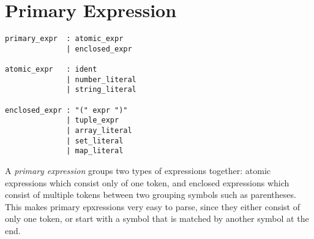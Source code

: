 \section{Primary Expression}

\begin{verbatim}
primary_expr  : atomic_expr
              | enclosed_expr

atomic_expr   : ident
              | number_literal
              | string_literal

enclosed_expr : "(" expr ")"
              | tuple_expr
              | array_literal
              | set_literal
              | map_literal
\end{verbatim}

A \emph{primary expression} groups two types of expressions together: atomic
expressions which consist only of one token, and enclosed expressions which
consist of multiple tokens between two grouping symbols such as parentheses.
This makes primary epxressions very easy to parse, since they either consist of
only one token, or start with a symbol that is matched by another symbol at the
end.
